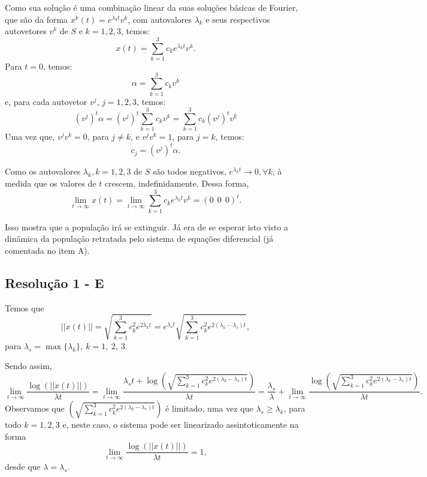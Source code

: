 Como sua solução é uma combinação linear da suas soluções básicas de Fourier, que são da forma \(x^k(t) = e^{\lambda_k t} v^k\), com autovalores \(\lambda_k\) e seus respectivos autovetores \(v^k\) de \(S\) e \(k = 1, 2, 3\), temos:
\[
x(t) = \displaystyle\sum_{k=1}^{3} c_k e^{\lambda_k t} v^k.
\]
Para \(t=0\), temos:
\[\alpha = \displaystyle\sum_{k=1}^{3} c_k v^k \]
e, para cada autovetor \(v^j\), \(j = 1, 2, 3\), temos:
\[
(v^j)^t \alpha = (v^j)^t \displaystyle\sum_{k=1}^{3} c_k v^k = \displaystyle\sum_{k=1}^{3} c_k (v^j)^t v^k
\]
Uma vez que, \(v^j v^k = 0\), para \(j \ne k\), e \(v^j v^k = 1\), para \(j=k\), temos:
\[c_j = (v^j)^t \alpha.\]

Como os autovalores \(\lambda_k, k = 1, 2, 3\) de \(S\) são todos negativos, \(e^{\lambda_k t} \longrightarrow 0, \forall k\), à medida que os valores de \(t\) crescem, indefinidamente. Dessa forma,
\[
\displaystyle\lim_{t \to \infty} x(t) = \displaystyle\lim_{t \to \infty} \displaystyle\sum_{k=1}^{3} c_k e^{\lambda_k t} v^k = (0 \ \ 0 \ \ 0)^t.
\]

Isso mostra que a população irá se extinguir. Já era de se esperar isto visto a dinâmica da população retratada pelo sistema de equações diferencial (já comentada no item A).




\subsection*{\blue Resolução 1 - \textbf{E}}


Temos que
\[
||x(t)||
= \sqrt{\displaystyle\sum_{k=1}^{3} c_k^2 e^{2\lambda_k t}}
= e^{\lambda_s t} \sqrt{\displaystyle\sum_{k=1}^{3} c_k^2 e^{2(\lambda_k-\lambda_s) t}},
\]
para \(\lambda_s = \max\{\lambda_k\},\ k = 1,\ 2,\ 3\).

Sendo assim,
\[
\displaystyle\lim_{t \to \infty}
\dfrac{\log(||x(t)||)}{\lambda t}
=
\displaystyle\lim_{t \to \infty}
\dfrac{\lambda_s t + \log\left(\sqrt{\displaystyle\sum_{k=1}^{3} c_k^2 e^{2(\lambda_k-\lambda_s) t}}\right)}{\lambda t}
=
\dfrac{\lambda_s}{\lambda} + \displaystyle\lim_{t \to \infty}
\dfrac{\log\left(\sqrt{\displaystyle\sum_{k=1}^{3} c_k^2 e^{2(\lambda_k-\lambda_s) t}}\right)}{\lambda t}.
\]
Observamos que \(\left(\sqrt{\displaystyle\sum_{k=1}^{3} c_k^2 e^{2(\lambda_k-\lambda_s) t}}\right)\) é limitado, uma vez que \(\lambda_s \ge \lambda_k\), para todo \(k = 1, 2, 3\) e, neste caso, o sistema pode ser linearizado assintoticamente na forma
\[\displaystyle\lim_{t \to \infty}
\dfrac{\log(||x(t)||)}{\lambda t} = 1,\]
desde que \(\lambda = \lambda_s\).





